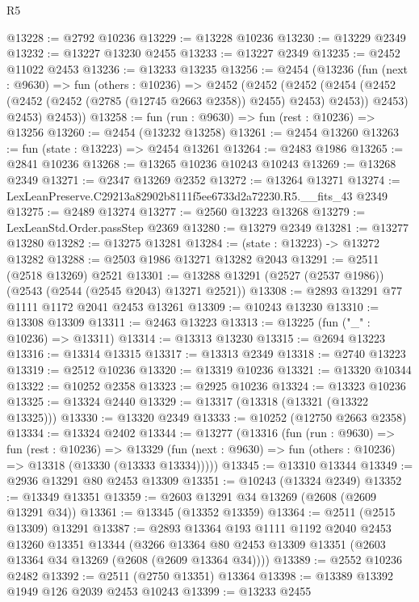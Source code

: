 \begin{lexlean}{R5}
\begin{coremodule}
@13228 := @2792 @10236
@13229 := @13228 @10236
@13230 := @13229 @2349
@13232 := @13227 @13230 @2455
@13233 := @13227 @2349
@13235 := @2452 @11022 @2453
@13236 := @13233 @13235
@13256 := @2454
    (@13236
      (fun (next : @9630) =>
      fun (others : @10236) =>
      @2452
        (@2452
          (@2452
            (@2454 (@2452 (@2452 (@2452 (@2785 (@12745 @2663 @2358)) @2455) @2453) @2453))
            @2453)
          @2453)
        @2453))
@13258 := fun (run : @9630) => fun (rest : @10236) => @13256
@13260 := @2454 (@13232 @13258)
@13261 := @2454 @13260
@13263 := fun (state : @13223) => @2454 @13261
@13264 := @2483 @1986
@13265 := @2841 @10236
@13268 := @13265 @10236 @10243 @10243
@13269 := @13268 @2349
@13271 := @2347 @13269 @2352
@13272 := @13264 @13271
@13274 := LexLeanPreserve.C29213a82902b8111f5ee6733d2a72230.R5.__fits_43 @2349
@13275 := @2489 @13274
@13277 := @2560 @13223 @13268
@13279 := LexLeanStd.Order.passStep @2369
@13280 := @13279 @2349
@13281 := @13277 @13280
@13282 := @13275 @13281
@13284 := (state : @13223) -> @13272 @13282
@13288 := @2503 @1986 @13271 @13282 @2043
@13291 := @2511 (@2518 @13269) @2521
@13301 := @13288 @13291 (@2527 (@2537 @1986)) (@2543 (@2544 (@2545 @2043) @13271 @2521))
@13308 := @2893 @13291 @77 @1111 @1172 @2041 @2453 @13261
@13309 := @10243 @13230
@13310 := @13308 @13309
@13311 := @2463 @13223
@13313 := @13225 (fun ("_" : @10236) => @13311)
@13314 := @13313 @13230
@13315 := @2694 @13223
@13316 := @13314 @13315
@13317 := @13313 @2349
@13318 := @2740 @13223
@13319 := @2512 @10236
@13320 := @13319 @10236
@13321 := @13320 @10344
@13322 := @10252 @2358
@13323 := @2925 @10236
@13324 := @13323 @10236
@13325 := @13324 @2440
@13329 := @13317 (@13318 (@13321 (@13322 @13325)))
@13330 := @13320 @2349
@13333 := @10252 (@12750 @2663 @2358)
@13334 := @13324 @2402
@13344 := @13277
    (@13316
      (fun (run : @9630) =>
      fun (rest : @10236) =>
      @13329 (fun (next : @9630) => fun (others : @10236) => @13318 (@13330 (@13333 @13334)))))
@13345 := @13310 @13344
@13349 := @2936 @13291 @80 @2453 @13309
@13351 := @10243 (@13324 @2349)
@13352 := @13349 @13351
@13359 := @2603 @13291 @34 @13269 (@2608 (@2609 @13291 @34))
@13361 := @13345 (@13352 @13359)
@13364 := @2511 (@2515 @13309) @13291
@13387 := @2893
    @13364
    @193
    @1111
    @1192
    @2040
    @2453
    @13260
    @13351
    @13344
    (@3266 @13364 @80 @2453 @13309 @13351 (@2603 @13364 @34 @13269 (@2608 (@2609 @13364 @34))))
@13389 := @2552 @10236 @2482
@13392 := @2511 (@2750 @13351) @13364
@13398 := @13389 @13392 @1949 @126 @2039 @2453 @10243
@13399 := @13233 @2455

\end{coremodule}
\end{lexlean}
